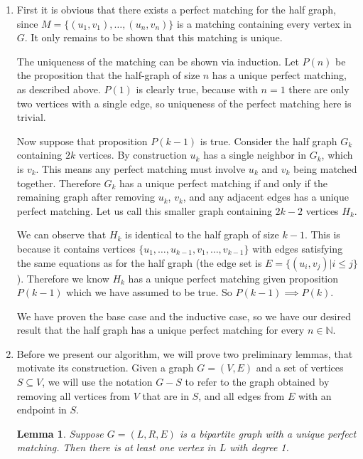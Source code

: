 \documentclass{hmcpset}
\newtheorem{lemma}{Lemma}
\begin{document}
\begin{solution}
\begin{enumerate}[label=(\Alph*)]
  \item 

First it is obvious that there exists a perfect matching for the half graph, since
$M = \{(u_1,v_1),\ldots,(u_n,v_n)\}$ is a matching containing every vertex in $G$.
It only remains to be shown that this matching is unique.

The uniqueness of the matching can be shown via induction. Let $P(n)$ be the
proposition that the half-graph of size $n$ has a unique perfect matching,
as described above. $P(1)$ is clearly true, because with $n = 1$ there are only
two vertices with a single edge, so uniqueness of the perfect matching here
is trivial.

Now suppose that proposition $P(k - 1)$ is true. Consider the half graph $G_k$
containing $2k$ vertices. By construction $u_k$ has a single neighbor in $G_k$,
which is $v_k$. This means any perfect matching must involve $u_k$ and $v_k$
being matched together. Therefore $G_k$ has a unique perfect matching if and
only if the remaining graph after removing $u_k$, $v_k$, and any adjacent edges
has a unique perfect matching. Let us call this smaller graph containing
$2k -2$ vertices $H_k$.

We can observe that $H_k$ is identical to the half graph of size $k - 1$. This
is because it contains vertices $\{u_1,\ldots,u_{k-1},v_1,\ldots,v_{k-1}\}$ with
edges satisfying the same equations as for the half graph (the edge set is
$E = \{(u_i, v_j) | i \leq j\}$). Therefore we know $H_k$ has a unique perfect
matching given proposition $P(k - 1)$ which we have assumed to be true.
So $P(k - 1) \implies P(k)$.

We have proven the base case and the inductive case, so we have our desired
result that the half graph has a unique perfect matching for every $n \in \mathbb{N}$.

\item

Before we present our algorithm, we will prove two preliminary lemmas, that motivate
its construction. Given a graph $G = (V, E)$ and a set of vertices $S \subseteq V$,
we will use the notation $G - S$ to refer to the graph obtained by removing all
vertices from $V$ that are in $S$, and all edges from $E$ with an endpoint in $S$.

\begin{lemma}
  Suppose $G = (L, R, E)$ is a bipartite graph with a unique perfect matching. Then
  there is at least one vertex in $L$ with degree 1.
\end{lemma}


\end{enumerate}
\end{solution}
\end{document}
